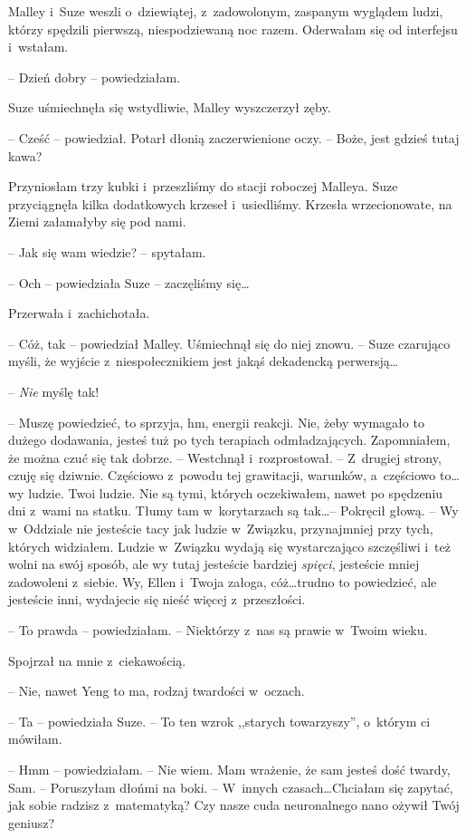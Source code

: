 \documentclass[oneside,polish,11pt,sfheadings]{mwbk}
\begin{document}
Malley i~Suze weszli o~dziewiątej, z~zadowolonym, zaspanym wyglądem
ludzi, którzy spędzili pierwszą, niespodziewaną noc razem. Oderwałam się
od interfejsu i~wstałam.

-- Dzień dobry -- powiedziałam.

Suze uśmiechnęła się wstydliwie, Malley wyszczerzył zęby. 

-- Cześć -- powiedział. Potarł dłonią zaczerwienione oczy. -- Boże, jest gdzieś tutaj
kawa?

Przyniosłam trzy kubki i~przeszliśmy do stacji roboczej Malleya. Suze
przyciągnęła kilka dodatkowych krzeseł i~usiedliśmy. Krzesła
wrzecionowate, na Ziemi załamałyby się pod nami.

-- Jak się wam wiedzie? -- spytałam.

-- Och -- powiedziała Suze -- zaczęliśmy się\ldots 

Przerwała i~zachichotała.

-- Cóż, tak -- powiedział Malley. Uśmiechnął się do niej znowu. -- Suze
czarująco myśli, że wyjście z~niespołecznikiem jest jakąś dekadencką
perwersją\ldots 

-- \textit{Nie} myślę tak!

-- Muszę powiedzieć, to sprzyja, hm, energii reakcji. Nie, żeby wymagało
to dużego dodawania, jesteś tuż po tych terapiach odmładzających.
Zapomniałem, że można czuć się tak dobrze. -- Westchnął i~rozprostował. -- Z~drugiej strony, czuję się dziwnie. Częściowo z~powodu tej grawitacji,
warunków, a~częściowo to\ldots  wy ludzie. Twoi ludzie. Nie są tymi, których
oczekiwałem, nawet po spędzeniu dni z~wami na statku. Tłumy tam w~korytarzach są tak\ldots  -- Pokręcił głową. -- Wy w~Oddziale nie jesteście
tacy jak ludzie w~Związku, przynajmniej przy tych, których widziałem.
Ludzie w~Związku wydają się wystarczająco szczęśliwi i~też wolni na swój
sposób, ale wy tutaj jesteście bardziej \textit{spięci}, jesteście mniej
zadowoleni z~siebie. Wy, Ellen i~Twoja załoga, cóż\ldots  trudno to
powiedzieć, ale jesteście inni, wydajecie się nieść więcej z~przeszłości.

-- To prawda -- powiedziałam. -- Niektórzy z~nas są prawie w~Twoim wieku.

Spojrzał na mnie z~ciekawością. 

-- Nie, nawet Yeng to ma, rodzaj
twardości w~oczach.

-- Ta -- powiedziała Suze. -- To ten wzrok ,,starych towarzyszy'', o~którym
ci mówiłam.

-- Hmm -- powiedziałam. -- Nie wiem. Mam wrażenie, że sam jesteś dość
twardy, Sam. -- Poruszyłam dłońmi na boki. -- W~innych czasach\ldots  Chciałam
się zapytać, jak sobie radzisz z~matematyką? Czy nasze cuda neuronalnego
nano ożywił Twój geniusz?
\end{document}
